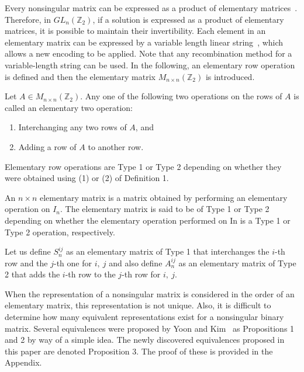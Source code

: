 Every nonsingular matrix can be expressed as a product of elementary matrices~\cite{anderson1998turning}. Therefore, in $ GL_n\left(\mathbb{Z}_2\right) $, if a solution is expressed as a product of elementary matrices, it is possible to maintain their invertibility. Each element in an elementary matrix can be expressed by a variable length linear string~\cite{yoon2014mathematical}, which allows a new encoding to be applied. Note that any recombination method for a variable-length string can be used.
In the following, an elementary row operation is defined and then the elementary matrix $ M_{n\times n}\left(\mathbb{Z}_2\right) $ is introduced.
\begin{definition}
Let $ A\in M_{n\times n}\left(\mathbb{Z}_2\right) $. Any one of the following two operations on the rows of $ A $ is called an elementary two operation:
\begin{enumerate}
	\item Interchanging any two rows of $ A $, and
	\item Adding a row of $ A $ to another row.
\end{enumerate}
\end{definition}
Elementary row operations are Type 1 or Type 2 depending on whether they were obtained using (1) or (2) of Definition 1.
\begin{definition}
An $ n\times n $ elementary matrix is a matrix obtained by performing an elementary operation on $ I_n $. The elementary matrix is said to be of Type 1 or Type 2 depending on whether the elementary operation performed on In is a Type 1 or Type 2 operation, respectively.
\end{definition}

Let us define $ S_n^{ij} $ as an elementary matrix of Type 1 that interchanges the $ i $-th row and the $ j $-th one for $ i,\ j $ and also define $ A_n^{ij} $ as an elementary matrix of Type 2 that adds the $ i $-th row to the $ j $-th row for $ i,\ j $.

When the representation of a nonsingular matrix is considered in the order of an elementary matrix, this representation is not unique. Also, it is difficult to determine how many equivalent representations exist for a nonsingular binary matrix. Several equivalences were proposed by Yoon and Kim~\cite{yoon2014mathematical} as Propositions 1 and 2 by way of a simple idea. The newly discovered equivalences proposed in this paper are denoted Proposition 3. The proof of these is provided in the Appendix.

